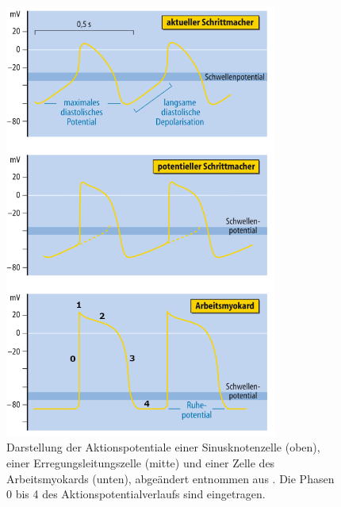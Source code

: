 \begin{figure}[!ht]%
\centering
	\includegraphics[width=0.80\textwidth]{./Bilder/Aktionspotentiale.png}
\caption[Darstellung von Aktionspotentialen verschiedener Zellen]{Darstellung der Aktionspotentiale einer Sinusknotenzelle (oben), einer Erregungsleitungszelle (mitte) und einer Zelle des Arbeitsmyokards (unten), abgeändert entnommen aus \cite{schmidt_physiologie_2005}. Die Phasen 0 bis 4 des Aktionspotentialverlaufs sind eingetragen.} 
\label{fig:Aktionspotential}
\end{figure}  

